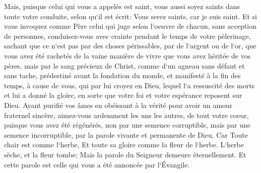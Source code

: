 \verse Mais, puisque celui qui vous a appelés est saint, vous aussi soyez saints dans toute votre conduite, selon qu`il est écrit: 
\verse Vous serez saints, car je suis saint. 
\verse Et si vous invoquez comme Père celui qui juge selon l`oeuvre de chacun, sans acception de personnes, conduisez-vous avec crainte pendant le temps de votre pèlerinage, 
\verse sachant que ce n`est pas par des choses périssables, par de l`argent ou de l`or, que vous avez été rachetés de la vaine manière de vivre que vous avez héritée de vos pères, 
\verse mais par le sang précieux de Christ, comme d`un agneau sans défaut et sans tache, 
\verse prédestiné avant la fondation du monde, et manifesté à la fin des temps, à cause de vous, 
\verse qui par lui croyez en Dieu, lequel l`a ressuscité des morts et lui a donné la gloire, en sorte que votre foi et votre espérance reposent sur Dieu. 
\verse Ayant purifié vos âmes en obéissant à la vérité pour avoir un amour fraternel sincère, aimez-vous ardemment les uns les autres, de tout votre coeur, 
\verse puisque vous avez été régénérés, non par une semence corruptible, mais par une semence incorruptible, par la parole vivante et permanente de Dieu. 
\verse Car Toute chair est comme l`herbe, Et toute sa gloire comme la fleur de l`herbe. L`herbe sèche, et la fleur tombe; 
\verse Mais la parole du Seigneur demeure éternellement. Et cette parole est celle qui vous a été annoncée par l`Évangile. 

\chapter{}

